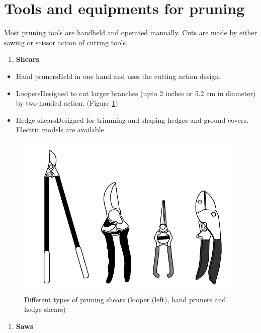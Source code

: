 \documentclass[
]{article}
\providecommand{\tightlist}{%
  \setlength{\itemsep}{0pt}\setlength{\parskip}{0pt}}
\begin{document}
\hypertarget{tools-and-equipments-for-pruning}{%
\section*{Tools and equipments for pruning}\label{tools-and-equipments-for-pruning}}

Most pruning tools are handheld and operated manually. Cuts are made by either sawing or scissor action of cutting tools.

\begin{enumerate}
\def\labelenumi{\arabic{enumi}.}
\tightlist
\item
  \textbf{Shears}
\end{enumerate}

\begin{itemize}
\tightlist
\item
  Hand pruners\newline Held in one hand and uses the cutting action design.
\item
  Loopers\newline Designed to cut larger branches (upto 2 inches or 5.2 cm in diameter) by two-handed action. (Figure \ref{fig:looper-shear})
\item
  Hedge shears\newline Designed for trimming and shaping hedges and ground covers. Electric models are available.
\end{itemize}

\begin{figure}

{\centering \includegraphics[width=.48\linewidth]{./../images/fruits/looping-shear} 

}

\caption{Different types of pruning shears (looper (left), hand pruners and hedge shears)}\label{fig:looper-shear}
\end{figure}

\begin{enumerate}
\def\labelenumi{\arabic{enumi}.}
\setcounter{enumi}{1}
\tightlist
\item
  \textbf{Saws}
\end{enumerate}
\end{document}
